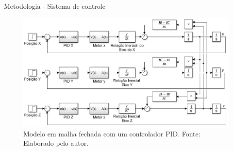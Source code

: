 \documentclass{beamer}
\begin{document}

\begin{frame}{Metodologia - Sistema de controle}
    \begin{figure}[HT]
		\begin{center}
		\captionsetup{justification=centering}
        \includegraphics[scale=.42]{../metodologia/img/modelo_satelite_pid}
        \caption{Modelo em malha fechada com um controlador PID. \newline
        		 Fonte: Elaborado pelo autor.}
		\label{FIG_ADAPTATIVO}
        \end{center}
	\end{figure}
\end{frame}

\end{document}
